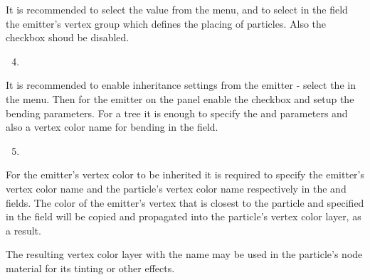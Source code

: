 \documentclass[a4paper,12pt,oneside]{sphinxmanual}
\begin{document}
It is recommended to select the  value from the  menu, and to select in the  field the emitter's vertex group which defines the placing of particles. Also the  checkbox shoud be disabled.
\begin{enumerate}
\setcounter{enumi}{3}
\item {} 

\end{enumerate}

It is recommended to enable inheritance settings from the emitter - select the  in the  menu. Then for the emitter on the  panel enable the  checkbox and setup the bending parameters. For a tree it is enough to specify the  and  parameters and also a vertex color name for bending in the  field.
\begin{enumerate}
\setcounter{enumi}{4}
\item {} 

\end{enumerate}

For the emitter's vertex color to be inherited it is required to specify the emitter's vertex color name and the particle's vertex color name respectively in the  and  fields. The color of the emitter's vertex that is closest to the particle and specified in the  field will be copied and propagated into the  particle's vertex color layer, as a result.

The resulting vertex color layer with the  name may be used in the particle's node material for its tinting or other effects.
\end{document}
